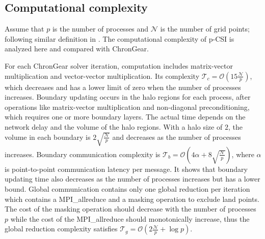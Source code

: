 \subsection{Computational complexity}  \label{subse:complex}
Assume that $p$ is the number of processes and $\mathcal{N} $ is the number of grid points; following similar definition in \citet{hu2015improving}.
The computational complexity of p-CSI is analyzed here and compared with ChronGear.

For each ChronGear solver iteration, computation includes matrix-vector multiplication and vector-vector multiplication. Its complexity $\mathcal{T}_c = \mathcal{O}(15\frac{\mathcal{N}}{p})$, which decreases and has a lower limit of zero when the number of processes increases. Boundary updating occurs in the halo regions for each process, after operations like matrix-vector multiplication and non-diagonal preconditioning, which requires one or more boundary layers. The actual time depends on the network delay and the volume of the halo regions.  With a halo size of $2$, the volume in each boundary is $2\sqrt{\frac{\mathcal{N}}{p}}$ and decreases as the number of processes increases. Boundary communication complexity is $\mathcal{T}_b =\mathcal{O}(4\alpha + 8\sqrt{\frac{\mathcal{N}}{p}})$, where $\alpha$ is point-to-point communication latency per message.
It shows that boundary updating time also decreases as the number of processes increases but has a lower bound.
Global communication contains only one global reduction per iteration which contains a MPI\_allreduce and a masking operation to exclude land points. The cost of the masking operation should decrease with the number of processes $p$ while the cost of the MPI\_allreduce should monotonically increase, thus the global
reduction complexity satisfies $\mathcal{T}_g= \mathcal{O}(2\frac{\mathcal{N}}{p} + \log p )$.


